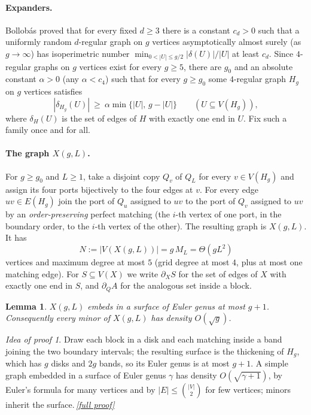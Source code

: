 \documentclass[11pt,a4paper]{article}
\theoremstyle{plain}
\newtheorem{lemma}[theorem]{Lemma}
\theoremstyle{definition}
\theoremstyle{remark}
\newtheorem*{proofidea}{Idea of proof}
\newcommand{\fullproofref}[1]{\,\hyperref[#1]{\textit{[full proof]}}}
\begin{document}
\paragraph{Expanders.}
Bollobás \cite{Bollobas88} proved that for every fixed $d\ge3$ there is a constant $c_d>0$ such that a uniformly random $d$-regular graph on $g$ vertices asymptotically almost surely (as $g\to\infty$) has isoperimetric number $\min_{0<|U|\le g/2}|\delta(U)|/|U|$ at least $c_d$. Since $4$-regular graphs on $g$ vertices exist for every $g\ge5$, there are $g_0$ and an absolute constant $\alpha>0$ (any $\alpha<c_4$) such that for every $g\ge g_0$ some $4$-regular graph $H_g$ on $g$ vertices satisfies
\begin{equation}\label{eq:expander}
 |\delta_{H_g}(U)|\ \ge\ \alpha\min\{|U|,\,g-|U|\}\qquad(U\subseteq V(H_g)),
\end{equation}
where $\delta_H(U)$ is the set of edges of $H$ with exactly one end in $U$. Fix such a family once and for all.

\paragraph{The graph $X(g,L)$.}
For $g\ge g_0$ and $L\ge1$, take a disjoint copy $Q_v$ of $Q_L$ for every $v\in V(H_g)$ and assign its four ports bijectively to the four edges at $v$. For every edge $uv\in E(H_g)$ join the port of $Q_u$ assigned to $uv$ to the port of $Q_v$ assigned to $uv$ by an \emph{order-preserving} perfect matching (the $i$-th vertex of one port, in the boundary order, to the $i$-th vertex of the other). The resulting graph is $X(g,L)$. It has
\begin{equation}\label{eq:N}
 N:=|V(X(g,L))|=g\,M_L=\Theta(gL^2)
\end{equation}
vertices and maximum degree at most $5$ (grid degree at most $4$, plus at most one matching edge). For $S\subseteq V(X)$ we write $\partial_X S$ for the set of edges of $X$ with exactly one end in $S$, and $\partial_Q A$ for the analogous set inside a block.

\begin{lemma}\label{lem:genus}
$X(g,L)$ embeds in a surface of Euler genus at most $g+1$. Consequently every minor of $X(g,L)$ has density $O(\sqrt g)$.
\end{lemma}
\begin{proofidea}
Draw each block in a disk and each matching inside a band joining the two boundary intervals; the resulting surface is the thickening of $H_g$, which has $g$ disks and $2g$ bands, so its Euler genus is at most $g+1$. A simple graph embedded in a surface of Euler genus $\gamma$ has density $O(\sqrt{\gamma+1})$, by Euler's formula for many vertices and by $|E|\le\binom{|V|}2$ for few vertices; minors inherit the surface.\fullproofref{pf:genus}
\end{proofidea}
\end{document}
